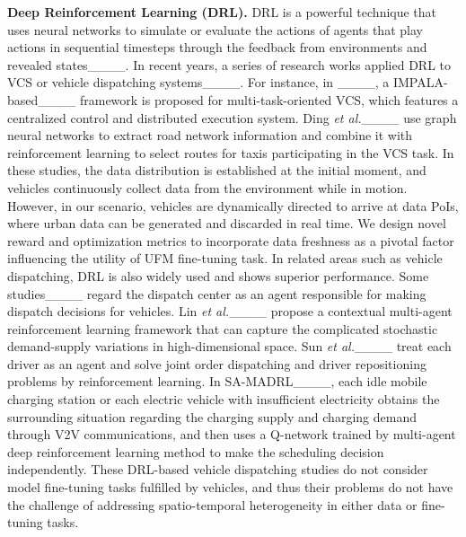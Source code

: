 \noindent\textbf{Deep Reinforcement Learning (DRL).}
DRL is a powerful technique that uses neural networks to simulate or evaluate the actions of agents that play actions in sequential timesteps through the feedback from environments and revealed states____. In recent years, a series of research works applied DRL to VCS or vehicle dispatching systems____. For instance, in ____, a 
IMPALA-based____ framework is proposed for multi-task-oriented VCS, which features a centralized control and distributed execution system. Ding \emph{et al.}____ use graph neural networks to extract road network information and combine it with reinforcement learning to select routes for taxis participating in the VCS task. In these studies, the data distribution is established at the initial moment, and vehicles continuously collect data from the environment while in motion. However, in our scenario, vehicles are dynamically directed to arrive at data PoIs, where urban data can be generated and discarded in real time. We design novel reward and optimization metrics to incorporate data freshness as a pivotal factor influencing the utility of UFM fine-tuning task. In related areas such as vehicle dispatching, DRL is also widely used and shows superior performance. Some studies____ regard the dispatch center as an agent responsible for making dispatch decisions for vehicles. Lin \emph{et al.}____ propose a contextual multi-agent reinforcement learning framework that can capture the complicated stochastic demand-supply variations in high-dimensional space. Sun \emph{et al.}____ treat each driver as an agent and solve joint order dispatching and driver repositioning problems by reinforcement learning. 
In SA-MADRL____, each idle mobile charging station or each electric vehicle with insufficient electricity obtains the surrounding situation regarding the charging supply and charging demand through V2V communications, and then uses a Q-network trained by multi-agent deep reinforcement learning method to make the scheduling decision independently.
These DRL-based vehicle dispatching studies do not consider model fine-tuning tasks fulfilled by vehicles, and thus their problems do not have the challenge of addressing spatio-temporal heterogeneity in either data or fine-tuning tasks.

